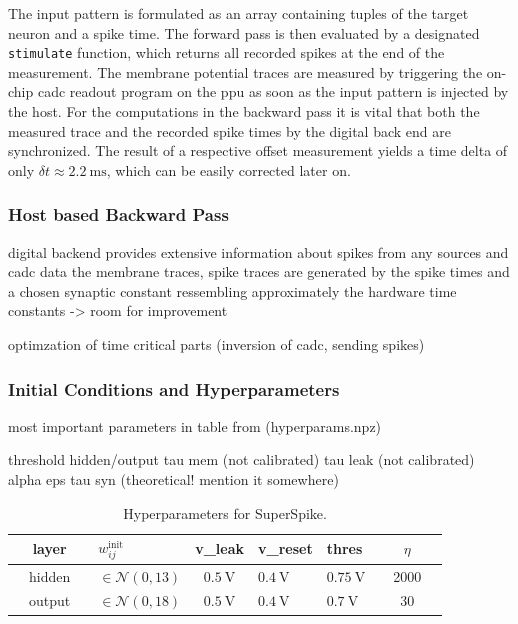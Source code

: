 The input pattern is formulated as an array containing tuples of the target neuron and a spike time. The forward pass is then evaluated by a designated \texttt{stimulate} function, which returns all recorded spikes at the end of the measurement. The membrane potential traces are measured by triggering the on-chip \gls{cadc} readout program on the \gls{ppu} as soon as the input pattern is injected by the host. For the computations in the backward pass it is vital that both the measured trace and the recorded spike times by the digital back end are synchronized. The result of a respective offset measurement yields a time delta of only $\delta t \approx \SI{2.2}{\milli \s}$, which can be easily corrected later on.

\subsubsection*{Host based Backward Pass}

digital backend provides extensive information about spikes from any sources and cadc data the membrane traces, spike traces are generated by the spike times and a chosen synaptic constant ressembling approximately the hardware time constants -> room for improvement

optimzation of time critical parts (inversion of cadc, sending spikes)

\subsubsection*{Initial Conditions and Hyperparameters}
most important parameters in table from (hyperparams.npz)
 	
threshold hidden/output
tau mem (not calibrated)
tau leak (not calibrated)
alpha 
eps
tau syn (theoretical! mention it somewhere)
\begin{table}\centering{}
	\begin{tabular}{@{}rcllclllcl@{}}\toprule
		&layer	 & & $w_{ij}^\text{init}$		& \gls{v_leak} 	& \gls{v_reset}	& \gls{thres} 	& & $\eta$	\\ \midrule
		&hidden  & & $\in \mathcal{N}(0,13)$	& $\SI{0.5}{\V}$& $\SI{0.4}{\V}$&$\SI{0.75}{\V}$& & 2000	\\
		&output  & & $\in \mathcal{N}(0,18)$	& $\SI{0.5}{\V}$& $\SI{0.4}{\V}$&$\SI{0.7}{\V}$	& & 30		\\ \bottomrule
	\end{tabular}
	\caption[Hyperparameters for SuperSpike.]{Hyperparameters for SuperSpike. }
\end{table}


